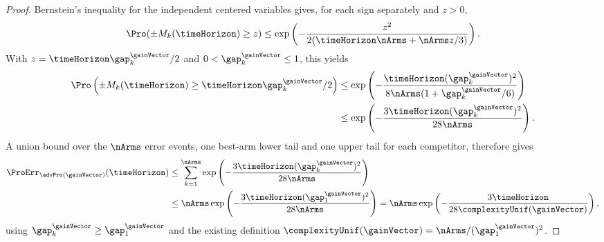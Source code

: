 \begin{proof}
Bernstein's inequality for the independent centered variables gives,
for each sign separately and $z>0$,
\[
\Pro(\pm M_k(\timeHorizon)\geq z)
\leq\exp\left(-\frac{z^2}
{2(\timeHorizon\nArms+\nArms z/3)}\right).
\]
With $z=\timeHorizon\gap_k^{\gainVector}/2$ and
$0<\gap_k^{\gainVector}\leq1$, this yields
\begin{align*}
\Pro\left(\pm M_k(\timeHorizon)
\geq\timeHorizon\gap_k^{\gainVector}/2\right)
&\leq\exp\left(-\frac{\timeHorizon(\gap_k^{\gainVector})^2}
{8\nArms(1+\gap_k^{\gainVector}/6)}\right)\\
&\leq\exp\left(-\frac{3\timeHorizon(\gap_k^{\gainVector})^2}
{28\nArms}\right).
\end{align*}
A union bound over the $\nArms$ error events, one best-arm lower tail
and one upper tail for each competitor, therefore gives
\begin{align*}
\ProErr_{\advPro(\gainVector)}(\timeHorizon)
&\leq\sum_{k=1}^{\nArms}
\exp\left(-\frac{3\timeHorizon(\gap_k^{\gainVector})^2}
{28\nArms}\right)\\
&\leq\nArms\exp\left(-\frac{3\timeHorizon(\gap_1^{\gainVector})^2}
{28\nArms}\right)
=\nArms\exp\left(-\frac{3\timeHorizon}
{28\complexityUnif(\gainVector)}\right),
\end{align*}
using $\gap_k^{\gainVector}\geq\gap_1^{\gainVector}$ and the existing
definition $\complexityUnif(\gainVector)=\nArms/(\gap_1^{\gainVector})^2$.
\end{proof}%
%
%
%